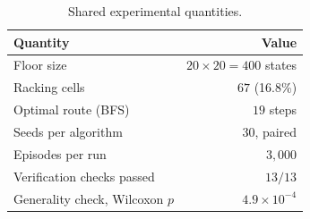 \begin{table}[ht]
\centering
\caption{Shared experimental quantities.}
\begin{tabular}{lr}
\toprule
\textbf{Quantity} & \textbf{Value} \\
\midrule
Floor size & $20 \times 20 = 400$ states \\
Racking cells & $67$ (16.8\%) \\
Optimal route (BFS) & $19$ steps \\
Seeds per algorithm & $30$, paired \\
Episodes per run & $3{,}000$ \\
Verification checks passed & $13 / 13$ \\
Generality check, Wilcoxon $p$ & $4.9\times10^{-4}$ \\
\bottomrule
\end{tabular}
\end{table}

